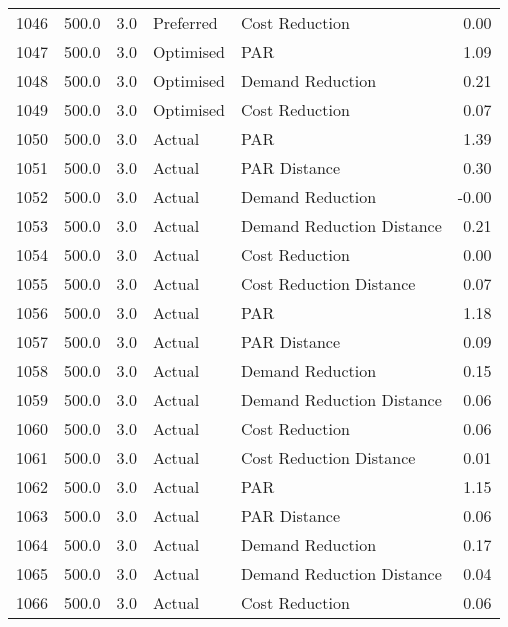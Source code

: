 \begin{longtable}{lrrllr}
1046 &        500.0 &     3.0 &      Preferred &             Cost Reduction &   0.00 \\
1047 &        500.0 &     3.0 &      Optimised &                        PAR &   1.09 \\
1048 &        500.0 &     3.0 &      Optimised &           Demand Reduction &   0.21 \\
1049 &        500.0 &     3.0 &      Optimised &             Cost Reduction &   0.07 \\
1050 &        500.0 &     3.0 &         Actual &                        PAR &   1.39 \\
1051 &        500.0 &     3.0 &         Actual &               PAR Distance &   0.30 \\
1052 &        500.0 &     3.0 &         Actual &           Demand Reduction &  -0.00 \\
1053 &        500.0 &     3.0 &         Actual &  Demand Reduction Distance &   0.21 \\
1054 &        500.0 &     3.0 &         Actual &             Cost Reduction &   0.00 \\
1055 &        500.0 &     3.0 &         Actual &    Cost Reduction Distance &   0.07 \\
1056 &        500.0 &     3.0 &         Actual &                        PAR &   1.18 \\
1057 &        500.0 &     3.0 &         Actual &               PAR Distance &   0.09 \\
1058 &        500.0 &     3.0 &         Actual &           Demand Reduction &   0.15 \\
1059 &        500.0 &     3.0 &         Actual &  Demand Reduction Distance &   0.06 \\
1060 &        500.0 &     3.0 &         Actual &             Cost Reduction &   0.06 \\
1061 &        500.0 &     3.0 &         Actual &    Cost Reduction Distance &   0.01 \\
1062 &        500.0 &     3.0 &         Actual &                        PAR &   1.15 \\
1063 &        500.0 &     3.0 &         Actual &               PAR Distance &   0.06 \\
1064 &        500.0 &     3.0 &         Actual &           Demand Reduction &   0.17 \\
1065 &        500.0 &     3.0 &         Actual &  Demand Reduction Distance &   0.04 \\
1066 &        500.0 &     3.0 &         Actual &             Cost Reduction &   0.06 \\

\end{longtable}

